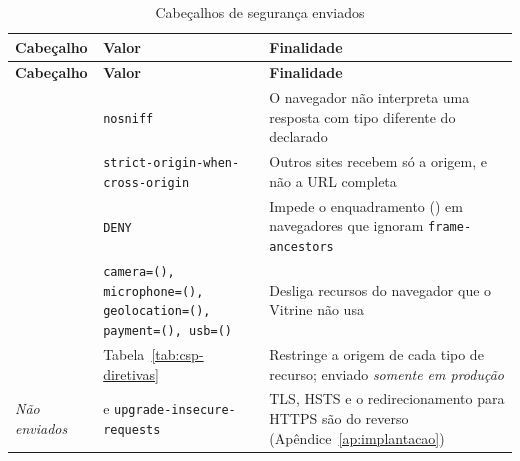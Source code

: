 \begingroup\small
\begin{longtable}{@{}L{3.6cm}L{4.4cm}L{5.2cm}@{}}
\caption{Cabeçalhos de segurança enviados}\label{tab:cabecalhos}\\
\toprule
\textbf{Cabeçalho} & \textbf{Valor} & \textbf{Finalidade}\\
\midrule
\endfirsthead
\toprule
\textbf{Cabeçalho} & \textbf{Valor} & \textbf{Finalidade}\\
\midrule
\endhead
\bottomrule
\endfoot
{} & \texttt{nosniff} & O navegador não interpreta uma resposta com tipo diferente do declarado\\
\addlinespace
{} & \texttt{strict-origin-when-\allowbreak cross-origin} & Outros sites recebem só a origem, e não a URL completa\\
\addlinespace
{} & \texttt{DENY} & Impede o enquadramento () em navegadores que ignoram \texttt{frame-ancestors}\\
\addlinespace
{} & \texttt{camera=(), microphone=(), geolocation=(), payment=(), usb=()} & Desliga recursos do navegador que o Vitrine não usa\\
\addlinespace
{} & Tabela~\ref{tab:csp-diretivas} & Restringe a origem de cada tipo de recurso; enviado \emph{somente em produção}\\
\addlinespace
\emph{Não enviados} &  e \texttt{upgrade-insecure-requests} & TLS, HSTS e o redirecionamento para HTTPS são do  reverso (Apêndice~\ref{ap:implantacao})\\
\end{longtable}
\endgroup

